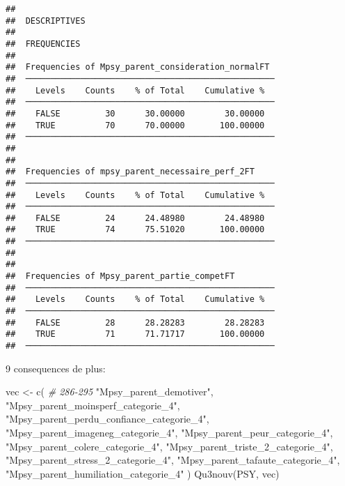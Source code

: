 \documentclass[
]{article}
\newenvironment{Shaded}{\begin{snugshade}}{\end{snugshade}}
\newcommand{\CommentTok}[1]{\textcolor[rgb]{0.56,0.35,0.01}{\textit{#1}}}
\newcommand{\FunctionTok}[1]{\textcolor[rgb]{0.00,0.00,0.00}{#1}}
\newcommand{\NormalTok}[1]{#1}
\newcommand{\OtherTok}[1]{\textcolor[rgb]{0.56,0.35,0.01}{#1}}
\newcommand{\StringTok}[1]{\textcolor[rgb]{0.31,0.60,0.02}{#1}}
\begin{document}
\begin{verbatim}
## 
##  DESCRIPTIVES
## 
##  FREQUENCIES
## 
##  Frequencies of Mpsy_parent_consideration_normalFT  
##  ────────────────────────────────────────────────── 
##    Levels    Counts    % of Total    Cumulative %   
##  ────────────────────────────────────────────────── 
##    FALSE         30      30.00000        30.00000   
##    TRUE          70      70.00000       100.00000   
##  ────────────────────────────────────────────────── 
## 
## 
##  Frequencies of mpsy_parent_necessaire_perf_2FT     
##  ────────────────────────────────────────────────── 
##    Levels    Counts    % of Total    Cumulative %   
##  ────────────────────────────────────────────────── 
##    FALSE         24      24.48980        24.48980   
##    TRUE          74      75.51020       100.00000   
##  ────────────────────────────────────────────────── 
## 
## 
##  Frequencies of Mpsy_parent_partie_competFT         
##  ────────────────────────────────────────────────── 
##    Levels    Counts    % of Total    Cumulative %   
##  ────────────────────────────────────────────────── 
##    FALSE         28      28.28283        28.28283   
##    TRUE          71      71.71717       100.00000   
##  ──────────────────────────────────────────────────
\end{verbatim}

9 consequences de plus:

\begin{Shaded}
\begin{Highlighting}[]
\NormalTok{vec }\OtherTok{\textless{}{-}} \FunctionTok{c}\NormalTok{(          }\CommentTok{\# 286{-}295}
  \StringTok{"Mpsy\_parent\_demotiver"}\NormalTok{,}
  \StringTok{"Mpsy\_parent\_moinsperf\_categorie\_4"}\NormalTok{,}
  \StringTok{"Mpsy\_parent\_perdu\_confiance\_categorie\_4"}\NormalTok{,}
  \StringTok{"Mpsy\_parent\_imageneg\_categorie\_4"}\NormalTok{,}
  \StringTok{"Mpsy\_parent\_peur\_categorie\_4"}\NormalTok{,}
  \StringTok{"Mpsy\_parent\_colere\_categorie\_4"}\NormalTok{,}
  \StringTok{"Mpsy\_parent\_triste\_2\_categorie\_4"}\NormalTok{,}
  \StringTok{"Mpsy\_parent\_stress\_2\_categorie\_4"}\NormalTok{,}
  \StringTok{"Mpsy\_parent\_tafaute\_categorie\_4"}\NormalTok{,}
  \StringTok{"Mpsy\_parent\_humiliation\_categorie\_4"}
\NormalTok{)}
\FunctionTok{Qu3nouv}\NormalTok{(PSY, vec)}
\end{Highlighting}
\end{Shaded}
\end{document}
